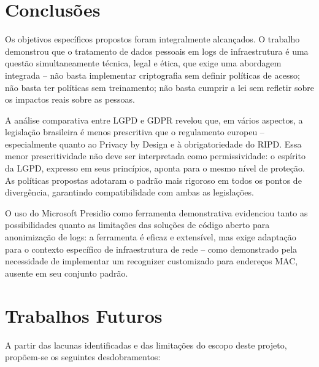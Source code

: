 \section{Conclusões}
\label{sec:conclusoes}

Os objetivos específicos propostos foram integralmente alcançados. O trabalho demonstrou que o tratamento de dados pessoais em logs de infraestrutura é uma questão simultaneamente técnica, legal e ética, que exige uma abordagem integrada -- não basta implementar criptografia sem definir políticas de acesso; não basta ter políticas sem treinamento; não basta cumprir a lei sem refletir sobre os impactos reais sobre as pessoas.

A análise comparativa entre LGPD e GDPR revelou que, em vários aspectos, a legislação brasileira é menos prescritiva que o regulamento europeu -- especialmente quanto ao Privacy by Design e à obrigatoriedade do RIPD. Essa menor prescritividade não deve ser interpretada como permissividade: o espírito da LGPD, expresso em seus princípios, aponta para o mesmo nível de proteção. As políticas propostas adotaram o padrão mais rigoroso em todos os pontos de divergência, garantindo compatibilidade com ambas as legislações.

O uso do Microsoft Presidio como ferramenta demonstrativa evidenciou tanto as possibilidades quanto as limitações das soluções de código aberto para anonimização de logs: a ferramenta é eficaz e extensível, mas exige adaptação para o contexto específico de infraestrutura de rede -- como demonstrado pela necessidade de implementar um recognizer customizado para endereços MAC, ausente em seu conjunto padrão.

\section{Trabalhos Futuros}
\label{sec:trabalhos-futuros}

A partir das lacunas identificadas e das limitações do escopo deste projeto, propõem-se os seguintes desdobramentos:

